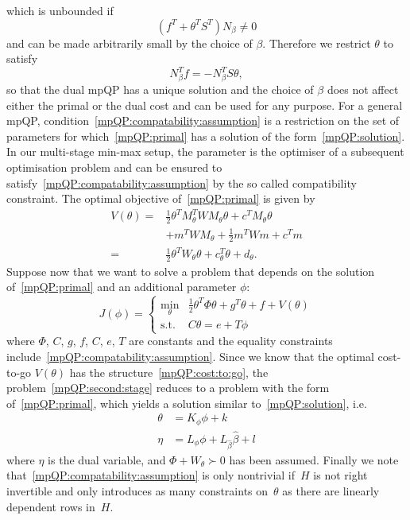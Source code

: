 \documentclass{ifacconf}
\begin{document}
which is unbounded if
\[
	(f^T+\theta^TS^T)N_\beta \neq 0
\]
and can be made arbitrarily small by the choice of $\beta$. Therefore we restrict $\theta$ to satisfy 
\begin{equation}\label{mpQP:compatability:assumption}
	N_\beta^Tf = -N_\beta^TS\theta,
\end{equation} 
so that the dual mpQP has a unique solution
and the choice of $\beta$ does not affect either the primal or the dual cost and can be used for
any purpose. For a general mpQP, condition~\eqref{mpQP:compatability:assumption} is a restriction on the set
of parameters for which~\eqref{mpQP:primal} has a solution of the form~\eqref{mpQP:solution}.
In our multi-stage min-max setup, the parameter is the optimiser of a subsequent optimisation
problem and can be ensured to satisfy~\eqref{mpQP:compatability:assumption} by the so called 
compatibility constraint. The optimal objective of~\eqref{mpQP:primal} is given by
\begin{equation}\label{mpQP:cost:to:go}\begin{split}
	V(\theta) = &\frac{1}{2}\theta^T M_\theta^T W M_\theta \theta + c^TM_\theta \theta \\
& + m^TWM_\theta+\frac{1}{2}m^T Wm + c^Tm\\
=&\frac{1}{2} \theta^T W_\theta \theta + c^T_\theta \theta + d_\theta.
\end{split}\end{equation}
%
Suppose now that we want to solve a problem that depends on the solution of~\eqref{mpQP:primal} and an
additional parameter $\phi$:
\begin{equation}\label{mpQP:second:stage} 
	J(\phi) = \left\{\begin{array}{rl}
	\min_\theta & \frac{1}{2}\theta^T\Phi\theta + g^T\theta + f + V(\theta)\\
	\text{s.t.} & C\theta = e+T\phi
	\end{array}\right.
\end{equation}
where $\Phi$, $C$, $g$, $f$, $C$, $e$, $T$ are constants and
the equality constraints include~\eqref{mpQP:compatability:assumption}. Since we know
that the optimal cost-to-go $V(\theta)$ has the structure~\eqref{mpQP:cost:to:go},
the problem~\eqref{mpQP:second:stage} reduces to a problem with the form of~\eqref{mpQP:primal},
which yields a solution similar to~\eqref{mpQP:solution}, i.e.
\begin{equation}
\begin{split}
	\theta &= K_\phi \phi + k\\
	\eta &= L_\phi \phi + L_{\hat\beta} \hat\beta + l
\end{split}
\end{equation}
where $\eta$ is the dual variable, and $\Phi+W_\theta\succ 0$ has been assumed. Finally we note 
that~\eqref{mpQP:compatability:assumption} is only nontrivial if~$H$ is not right invertible and only 
introduces as many constraints on~$\theta$ as there are linearly
dependent rows in~$H$.
\end{document}
